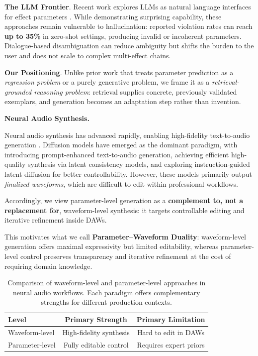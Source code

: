 \documentclass{article}
\begin{document}
\textbf{The LLM Frontier}. Recent work explores LLMs as natural language interfaces for effect parameters \citep{doh2025llm2fx,doh2025llm2fxtools,clemens2025mixassist}. While demonstrating surprising capability, these approaches remain vulnerable to hallucination: reported violation rates can reach \textbf{up to 35\%} in zero-shot settings, producing invalid or incoherent parameters. Dialogue-based disambiguation can reduce ambiguity but shifts the burden to the user and does not scale to complex multi-effect chains.

\textbf{Our Positioning}. Unlike prior work that treats parameter prediction as a \textit{regression problem} or a purely generative problem, we frame it as a \textit{retrieval-grounded reasoning problem}: retrieval supplies concrete, previously validated exemplars, and generation becomes an adaptation step rather than invention.

\noindent\textbf{Neural Audio Synthesis.}

Neural audio synthesis has advanced rapidly, enabling high-fidelity text-to-audio generation \citep{liu2023audioldm,liu2024audioldm2,agostinelli2023musiclm,vyas2023audiobox}. Diffusion models have emerged as the dominant paradigm, with \citet{huang2022makeanaudio} introducing prompt-enhanced text-to-audio generation, \citet{wang2023audiolcm} achieving efficient high-quality synthesis via latent consistency models, and \citet{liang2024instruction} exploring instruction-guided latent diffusion for better controllability. However, these models primarily output \textit{finalized waveforms}, which are difficult to edit within professional workflows.

Accordingly, we view parameter-level generation as a \textbf{complement to, not a replacement for}, waveform-level synthesis: it targets controllable editing and iterative refinement inside DAWs.

This motivates what we call \textbf{Parameter--Waveform Duality}: waveform-level generation offers maximal expressivity but limited editability, whereas parameter-level control preserves transparency and iterative refinement at the cost of requiring domain knowledge.

\begin{table}[t]
	\centering
	\caption{Comparison of waveform-level and parameter-level approaches in neural audio workflows. Each paradigm offers complementary strengths for different production contexts.}
	\label{tab:param_waveform_duality}
	\small
	\begin{tabular}{lcc}
		\toprule
		\textbf{Level} & \textbf{Primary Strength} & \textbf{Primary Limitation} \\
		\midrule
		Waveform-level                  & High-fidelity synthesis                    & Hard to edit in DAWs                         \\
		Parameter-level                 & Fully editable control                     & Requires expert priors                       \\
		\bottomrule
	\end{tabular}
\end{table}
\end{document}
